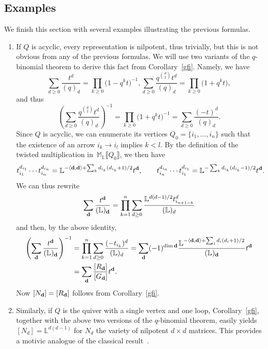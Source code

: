 \documentclass[10pt,a4paper]{amsart}
\numberwithin{equation}{section}
\theoremstyle{definition}
\begin{document}
\subsection{Examples}\label{ex part 1}

We finish this section with several examples illustrating the previous formulas.
\begin{enumerate}\itemsep=0pt
\item[(1)] If $Q$ is acyclic, every representation is nilpotent, thus
trivially, but this is not obvious from any of the previous formulas. We will use two variants of the $q$-binomial theorem to derive this fact from Corollary~\ref{gfi}. Namely, we have
\[\sum_{d\geq 0}\frac{t^d}{(q)_d}=\prod_{k\geq 0}\bigl(1-q^kt\bigr)^{-1}, \sum_{d\geq 0}\frac{q^{d\choose 2}t^d}{(q)_d}=\prod_{k\geq 0}\bigl(1+q^kt\bigr),\]
and thus
\[\left(\sum_{d\geq 0}\frac{q^{d\choose 2}t^d}{(q)_d}\right)^{-1}=\prod_{k\geq 0}\bigl(1+q^kt\bigr)^{-1}=\sum_{d\geq 0}\frac{(-t)^d}{(q)_d}.\]
Since $Q$ is acyclic, we can enumerate its vertices $Q_0=\{i_1,\dots,i_n\}$ such that the existence of an arrow $i_k\rightarrow i_l$ implies $k<l$. By the definition of the twisted multiplication in~$\mathbb{M}_\mathbb{L}\llbracket Q_0\rrbracket$, we then have
\[t_{i_1}^{d_{i_1}}\cdots t_{i_n}^{d_{i_n}}=\mathbb{L}^{-\langle{\bf d},{\bf d}\rangle+\sum_kd_{i_k}(d_{i_k}+1)/2}t^{\bf d},\qquad t_{i_n}^{d_{i_n}}\cdots t_{i_1}^{d_{i_1}}=\mathbb{L}^{-\sum_kd_{i_k}(d_{i_k}-1)/2}t^{\bf d}.\]
We can thus rewrite
\[\sum_{\bf d}\frac{t^{\bf d}}{(\mathbb{L})_{\bf d}}=\prod_{k=1}^n\sum_{d\geq 0}\frac{\mathbb{L}^{d(d-1)/2}t_{i_{n+1-k}}^d}{(\mathbb{L})_d}\]
and then, by the above identity,
\begin{align*}
\left(\sum_{\bf d}\frac{t^{\bf d}}{(\mathbb{L})_{\bf d}}\right)^{-1}&=\prod_{k=1}^n\sum_{d\geq 0}\frac{(-t_{i_k})^d}{(\mathbb{L})_d}
=\sum_{\bf d}(-1)^{\dim{\bf d}}\frac{\mathbb{L}^{-\langle{\bf d},{\bf d}\rangle+\sum_id_i(d_i+1)/2}}{(\mathbb{L})_{\bf d}}t^{\bf d}\\
&=\sum_{\bf d}\frac{[R_{\bf d}]}{[G_{\bf d}]}t^{\bf d}.\end{align*}
Now $[N_{\bf d}]=[R_{\bf d}]$ follows from Corollary~\ref{gfi}.
\item[(2)] Similarly, if $Q$ is the quiver with a single vertex and one loop, Corollary~\ref{gfi}, together with the above two versions of the $q$-binomial theorem, easily yields
$[N_d]=\mathbb{L}^{d(d-1)}$
for $N_d$ the variety of nilpotent $d\times d$ matrices. This provides a motivic analogue of the classical result~\cite{FH}.

\end{enumerate}
\end{document}
